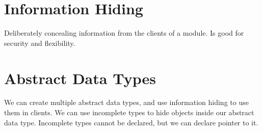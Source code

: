 \documentclass[openany]{book}
\begin{document}
    \section{Information Hiding}
    Deliberately concealing information from the clients of a module. Is good for security and flexibility.

    \section{Abstract Data Types}
    We can create multiple abstract data types, and use information hiding to use them in clients. We can use incomplete types to hide objects inside our abstract data type. Incomplete types cannot be declared, but we can declare pointer to it.
\end{document}
